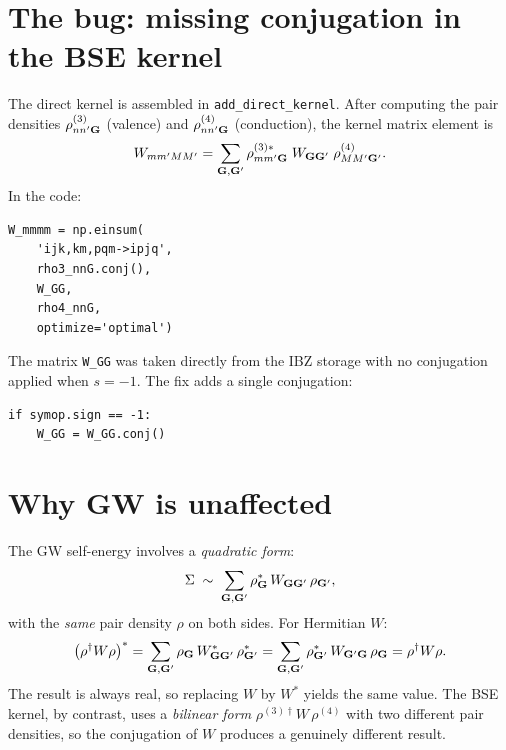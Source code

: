\documentclass[11pt,a4paper]{article}
\begin{document}
\section{The bug: missing conjugation in the BSE kernel}

The direct kernel is assembled in \texttt{add\_direct\_kernel}.  After
computing the pair densities $\rho^{(3)}_{nn'\vb{G}}$ (valence) and
$\rho^{(4)}_{nn'\vb{G}}$ (conduction), the kernel matrix element is
\begin{equation}
  W_{mm'MM'} = \sum_{\vb{G},\vb{G}'}
    \rho^{(3)*}_{mm'\vb{G}}\;
    W_{\vb{GG}'}\;
    \rho^{(4)}_{MM'\vb{G}'}.
\end{equation}
In the code:

\begin{lstlisting}[style=python,firstnumber=702,
  caption={\texttt{gpaw/response/bse.py}: Contraction of pair densities
           with $W$ in \texttt{add\_direct\_kernel}.}]
W_mmmm = np.einsum(
    'ijk,km,pqm->ipjq',
    rho3_nnG.conj(),
    W_GG,
    rho4_nnG,
    optimize='optimal')
\end{lstlisting}

The matrix \verb|W_GG| was taken directly from the IBZ storage with no
conjugation applied when $s = -1$.  The fix adds a single conjugation:

\begin{lstlisting}[style=python,firstnumber=698,
  caption={\texttt{gpaw/response/bse.py}: The fix --- conjugate $W$
           when the symmetry operation includes time reversal.}]
if symop.sign == -1:
    W_GG = W_GG.conj()
\end{lstlisting}

\section{Why GW is unaffected}

The GW self-energy involves a \emph{quadratic form}:
\begin{equation}
  \Sigma \;\sim\; \sum_{\vb{G},\vb{G}'}
    \rho^*_{\vb{G}}\, W_{\vb{GG}'}\, \rho_{\vb{G}'},
\end{equation}
with the \emph{same} pair density $\rho$ on both sides.  For Hermitian
$W$:
\begin{equation}
  \qty(\rho^\dagger W \rho)^*
  = \sum_{\vb{G},\vb{G}'}
    \rho_{\vb{G}}\, W^*_{\vb{GG}'}\, \rho^*_{\vb{G}'}
  = \sum_{\vb{G},\vb{G}'}
    \rho^*_{\vb{G}'}\, W_{\vb{G}'\vb{G}}\, \rho_{\vb{G}}
  = \rho^\dagger W \rho.
\end{equation}
The result is always real, so replacing $W$ by $W^*$ yields the same
value.  The BSE kernel, by contrast, uses a \emph{bilinear form}
$\rho^{(3)\dagger} W\, \rho^{(4)}$ with two different pair densities, so
the conjugation of $W$ produces a genuinely different result.
\end{document}
